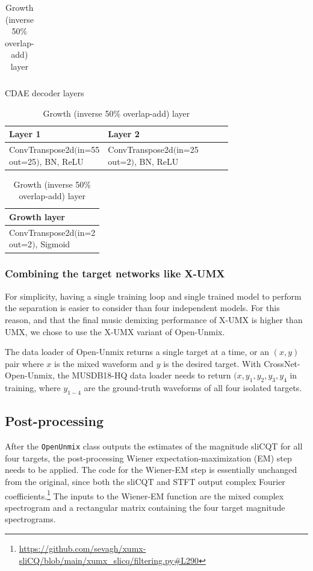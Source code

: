 \documentclass[report.tex]{subfiles}
\begin{document}
\begin{table}[ht]
\begin{tabular}{ |l|l|l|l|l| }
	 \hline
\end{tabular}
	\vspace{1em}
	\caption{CDAE decoder layers}
	\label{table:convtable4}
\begin{tabular}{ |l|l|l|l|l| }
	 \hline
		Layer 1 & Layer 2 \\
	 \hline
	 \hline
		ConvTranspose2d$\Big($\makecell[l]{in=55\\out=25}$\Big)$, BN, ReLU & ConvTranspose2d$\Big($\makecell[l]{in=25\\out=2}$\Big)$, BN, ReLU \\
	 \hline
\end{tabular}
	\vspace{1em}
	\caption{Growth (inverse 50\% overlap-add) layer}
	\label{table:convtable5}
\begin{tabular}{ |l| }
	 \hline
		Growth layer \\
	 \hline
	 \hline
		ConvTranspose2d$\Big($\makecell[l]{in=2\\out=2}$\Big)$, Sigmoid \\
	 \hline
\end{tabular}
\end{table}

\subsubsection{Combining the target networks like X-UMX}
\label{sec:xumxinc}

For simplicity, having a single training loop and single trained model to perform the separation is easier to consider than four independent models. For this reason, and that the final music demixing performance of X-UMX is higher than UMX, we chose to use the X-UMX variant of Open-Unmix.

The data loader of Open-Unmix returns a single target at a time, or an $(x, y)$ pair where $x$ is the mixed waveform and $y$ is the desired target. With CrossNet-Open-Unmix, the MUSDB18-HQ data loader needs to return $(x, y_{1}, y_{2}, y_{3}, y_{4}$ in training, where $y_{1-4}$ are the ground-truth waveforms of all four isolated targets.

\newpagefill

\subsection{Post-processing}
\label{sec:postprocessing}

After the \Verb#OpenUnmix# class outputs the estimates of the magnitude sliCQT for all four targets, the post-processing Wiener expectation-maximization (EM) step needs to be applied. The code for the Wiener-EM step is essentially unchanged from the original, since both the sliCQT and STFT output complex Fourier coefficients.\footnote{\url{https://github.com/sevagh/xumx-sliCQ/blob/main/xumx_slicq/filtering.py\#L290}} The inputs to the Wiener-EM function are the mixed complex spectrogram and a rectangular matrix containing the four target magnitude spectrograms.
\end{document}
